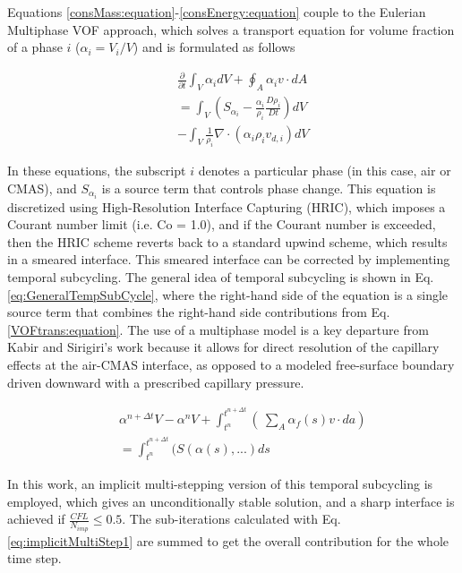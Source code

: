 \documentclass[%
 aip,
 amsmath,amssymb,
 reprint,%
]{revtex4-1}
\begin{document}
\noindent Equations \ref{consMass:equation}-\ref{consEnergy:equation} couple to the Eulerian Multiphase VOF approach, which solves a transport equation for volume fraction of a phase $i$ ($\alpha_{i} = V_{i}/V$) and is formulated as follows 

\begin{eqnarray}
\label{VOFtrans:equation}
    &&\frac{\partial}{\partial t}\int_{V}\alpha_{i}dV+ \oint_{A}\alpha_{i}v\cdot dA\nonumber\\
    &&=\int_{V}\left(S_{\alpha_{i}}-\frac{\alpha_i}{\rho_i}\frac{D\rho_{i}}{Dt}\right)dV\\
    &&-\int_{V} \frac{1}{\rho_{i}}\nabla\cdot \left(\alpha_{i}\rho_{i}v_{d,i}\right)dV\nonumber
\end{eqnarray}

\noindent In these equations, the subscript $i$ denotes a particular phase (in this case, air or CMAS), and $S_{\alpha_{i}}$ is a source term that controls phase change. This equation is discretized using High-Resolution Interface Capturing (HRIC), which imposes a Courant number limit (i.e. Co = 1.0), and if the Courant number is exceeded, then the HRIC scheme reverts back to a standard upwind scheme, which results in a smeared interface. This smeared interface can be corrected by implementing temporal subcycling. The general idea of temporal subcycling is shown in Eq. \ref{eq:GeneralTempSubCycle}, where the right-hand side of the equation is a single source term that combines the right-hand side contributions from Eq. \ref{VOFtrans:equation}. The use of a multiphase model is a key departure from Kabir and Sirigiri's work \cite{Kabir, Sirigiri2018} because it allows for direct resolution of the capillary effects at the air-CMAS interface, as opposed to a modeled free-surface boundary driven downward with a prescribed capillary pressure.

\begin{eqnarray}
\label{eq:GeneralTempSubCycle}
    &&\alpha^{n+\Delta t}V - \alpha^{n}V + \int_{t^{n}}^{t^{n+\Delta t}}( \ \sum_{A}\alpha_{f}(s) v \cdot da)\nonumber\\
    &&=\int_{t^{n}}^{t^{n+\Delta t}}(S(\alpha (s),...)ds
\end{eqnarray}


\noindent In this work, an implicit multi-stepping version of this temporal subcycling is employed, which gives an unconditionally stable solution, and a sharp interface is achieved if $\frac{CFL}{N_{imp}} \leqslant 0.5 $. The sub-iterations calculated with Eq. \ref{eq:implicitMultiStep1} are summed to get the overall contribution for the whole time step.
\end{document}
